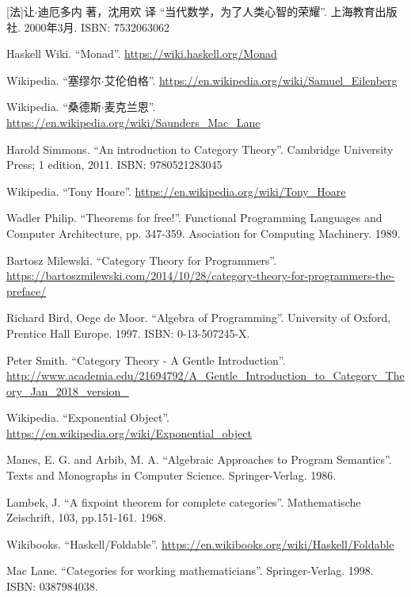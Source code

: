 \documentclass{article}
\begin{document}
\ifx\wholebook\relax \else
\begin{thebibliography}{99}

[法]让$\cdot$迪厄多内 著，沈用欢 译 ``当代数学，为了人类心智的荣耀''. 上海教育出版社. 2000年3月. ISBN: 7532063062

Haskell Wiki. ``Monad''. \url{https://wiki.haskell.org/Monad}

Wikipedia. ``塞缪尔$\cdot$艾伦伯格''. \url{https://en.wikipedia.org/wiki/Samuel_Eilenberg}

Wikipedia. ``桑德斯$\cdot$麦克兰恩''. \url{https://en.wikipedia.org/wiki/Saunders_Mac_Lane}

Harold Simmons. ``An introduction to Category Theory''.  Cambridge University Press; 1 edition, 2011. ISBN: 9780521283045

Wikipedia. ``Tony Hoare''. \url{https://en.wikipedia.org/wiki/Tony_Hoare}

Wadler Philip. ``Theorems for free!''. Functional Programming Languages and Computer Architecture, pp. 347-359. Asociation for Computing Machinery. 1989.

Bartosz Milewski. ``Category Theory for Programmers''. \url{https://bartoszmilewski.com/2014/10/28/category-theory-for-programmers-the-preface/}

Richard Bird, Oege de Moor. ``Algebra of Programming''. University of Oxford, Prentice Hall Europe. 1997. ISBN: 0-13-507245-X.

Peter Smith. ``Category Theory - A Gentle Introduction''. \url{http://www.academia.edu/21694792/A_Gentle_Introduction_to_Category_Theory_Jan_2018_version_}

Wikipedia. ``Exponential Object''. \url{https://en.wikipedia.org/wiki/Exponential_object}

Manes, E. G. and Arbib, M. A. ``Algebraic Approaches to Program Semantics''. Texts and Monographs in Computer Science. Springer-Verlag. 1986.

Lambek, J. ``A fixpoint theorem for complete categories''. Mathematische Zeischrift, 103, pp.151-161. 1968.

Wikibooks. ``Haskell/Foldable''.  \url{https://en.wikibooks.org/wiki/Haskell/Foldable}

Mac Lane. ``Categories for working mathematicians''. Springer-Verlag. 1998. ISBN: 0387984038.

\end{thebibliography}

\expandafter\enddocument

\fi
\end{document}
